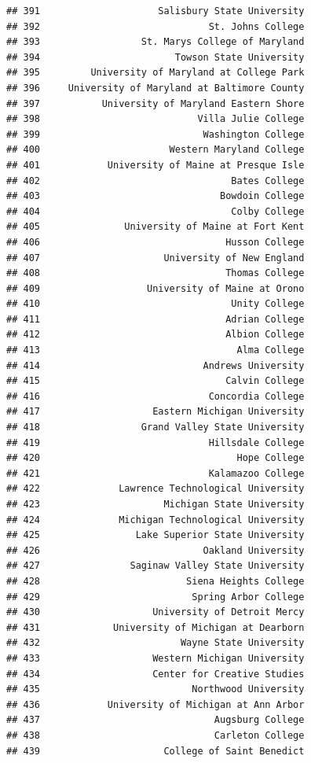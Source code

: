 \documentclass[]{article}
\begin{document}
\begin{verbatim}
## 391                     Salisbury State University
## 392                              St. Johns College
## 393                  St. Marys College of Maryland
## 394                        Towson State University
## 395         University of Maryland at College Park
## 396     University of Maryland at Baltimore County
## 397           University of Maryland Eastern Shore
## 398                            Villa Julie College
## 399                             Washington College
## 400                       Western Maryland College
## 401            University of Maine at Presque Isle
## 402                                  Bates College
## 403                                Bowdoin College
## 404                                  Colby College
## 405               University of Maine at Fort Kent
## 406                                 Husson College
## 407                      University of New England
## 408                                 Thomas College
## 409                   University of Maine at Orono
## 410                                  Unity College
## 411                                 Adrian College
## 412                                 Albion College
## 413                                   Alma College
## 414                             Andrews University
## 415                                 Calvin College
## 416                              Concordia College
## 417                    Eastern Michigan University
## 418                  Grand Valley State University
## 419                              Hillsdale College
## 420                                   Hope College
## 421                              Kalamazoo College
## 422              Lawrence Technological University
## 423                      Michigan State University
## 424              Michigan Technological University
## 425                 Lake Superior State University
## 426                             Oakland University
## 427                Saginaw Valley State University
## 428                          Siena Heights College
## 429                           Spring Arbor College
## 430                    University of Detroit Mercy
## 431             University of Michigan at Dearborn
## 432                         Wayne State University
## 433                    Western Michigan University
## 434                    Center for Creative Studies
## 435                           Northwood University
## 436            University of Michigan at Ann Arbor
## 437                               Augsburg College
## 438                               Carleton College
## 439                      College of Saint Benedict

\end{verbatim}
\end{document}

